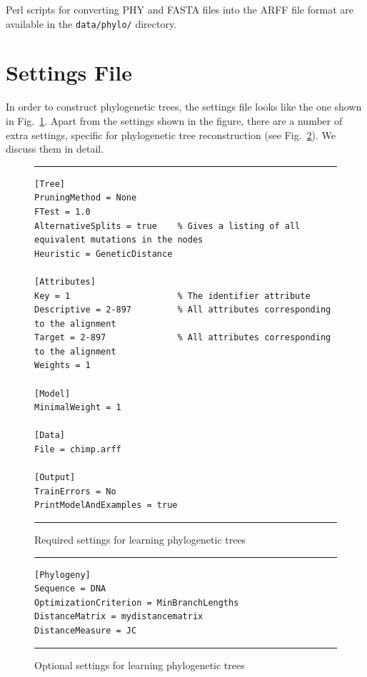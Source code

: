 \documentclass[a4paper]{report}
\begin{document}
Perl scripts for converting PHY and FASTA files into the ARFF file format are available in the {\tt data/phylo/} directory.

\section{Settings File}
In order to construct phylogenetic trees, the settings file looks like the one shown in Fig.~\ref{phylosettingsreq:fig}. Apart from the settings shown in the figure, there are a number of extra settings, specific for phylogenetic tree reconstruction (see Fig.~\ref{phylosettingsopt:fig}). We discuss them in detail.

\begin{figure}[tb]
\hrule
\begin{verbatim}
[Tree]
PruningMethod = None    
FTest = 1.0    
AlternativeSplits = true    % Gives a listing of all equivalent mutations in the nodes 
Heuristic = GeneticDistance

[Attributes]
Key = 1                     % The identifier attribute
Descriptive = 2-897         % All attributes corresponding to the alignment
Target = 2-897              % All attributes corresponding to the alignment
Weights = 1

[Model]
MinimalWeight = 1
    
[Data]
File = chimp.arff

[Output]
TrainErrors = No
PrintModelAndExamples = true
\end{verbatim}
\hrule
\caption{Required settings for learning phylogenetic trees}
\label{phylosettingsreq:fig}
\end{figure}

\begin{figure}[tb]
\hrule
\begin{verbatim}
[Phylogeny]
Sequence = DNA
OptimizationCriterion = MinBranchLengths
DistanceMatrix = mydistancematrix
DistanceMeasure = JC
\end{verbatim}
\hrule
\caption{Optional settings for learning phylogenetic trees}
\label{phylosettingsopt:fig}
\end{figure}
\end{document}

